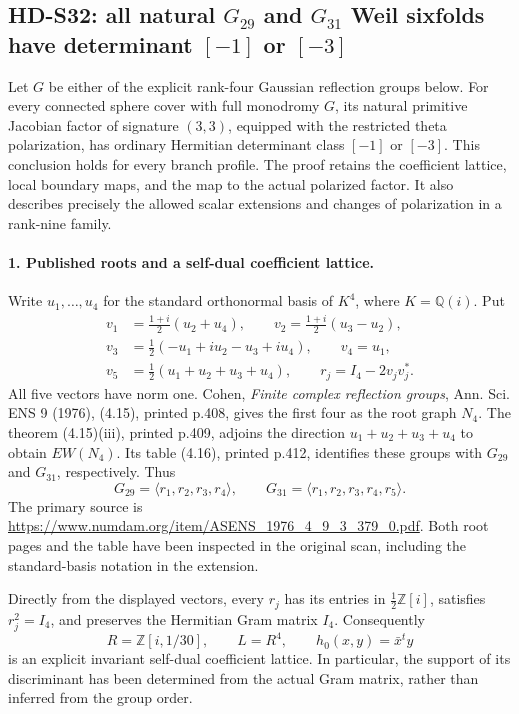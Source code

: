 \subsection{HD-S32: all natural \(G_{29}\) and \(G_{31}\) Weil sixfolds have determinant \([-1]\) or \([-3]\)}
\label{sec:gaussian-rank-four-scope}

Let \(G\) be either of the explicit rank-four Gaussian reflection
groups below. For every connected sphere cover with full monodromy
\(G\), its natural primitive Jacobian factor of signature \((3,3)\),
equipped with the restricted theta polarization, has ordinary
Hermitian determinant class \([-1]\) or \([-3]\). This conclusion
holds for every branch profile. The proof retains the coefficient
lattice, local boundary maps, and the map to the actual polarized
factor. It also describes precisely the allowed scalar extensions
and changes of polarization in a rank-nine family.

\paragraph{1. Published roots and a self-dual coefficient lattice.}
Write \(u_1,\ldots,u_4\) for the standard orthonormal basis of
\(K^4\), where \(K=\mathbb Q(i)\). Put
\[
\begin{split}
 v_1&=\tfrac{1+i}{2}(u_2+u_4),\qquad
 v_2=\tfrac{1+i}{2}(u_3-u_2),\\
 v_3&=\tfrac12(-u_1+iu_2-u_3+iu_4),\qquad v_4=u_1,\\
 v_5&=\tfrac12(u_1+u_2+u_3+u_4),\qquad
 r_j=I_4-2v_jv_j^*.
\end{split}
\]
All five vectors have norm one. Cohen, \emph{Finite complex
reflection groups}, Ann. Sci. ENS 9 (1976), (4.15), printed p.408,
gives the first four as the root graph \(N_4\). The theorem
(4.15)(iii), printed p.409, adjoins the direction
\(u_1+u_2+u_3+u_4\) to obtain \(EW(N_4)\). Its table (4.16),
printed p.412, identifies these groups with \(G_{29}\) and
\(G_{31}\), respectively. Thus
\[
 G_{29}=\langle r_1,r_2,r_3,r_4\rangle,
 \qquad G_{31}=\langle r_1,r_2,r_3,r_4,r_5\rangle.
\]
The primary source is
\url{https://www.numdam.org/item/ASENS_1976_4_9_3_379_0.pdf}.
Both root pages and the table have been inspected in the original
scan, including the standard-basis notation in the extension.

Directly from the displayed vectors, every \(r_j\) has its entries
in \(\tfrac12\mathbb Z[i]\), satisfies \(r_j^2=I_4\), and
preserves the Hermitian Gram matrix \(I_4\). Consequently
\[
 R=\mathbb Z[i,1/30],\qquad L=R^4,\qquad h_0(x,y)=\bar x^t y
 \tag{S32.1}
\]
is an explicit invariant self-dual coefficient lattice. In particular,
the support of its discriminant has been determined from the actual
Gram matrix, rather than inferred from the group order.

